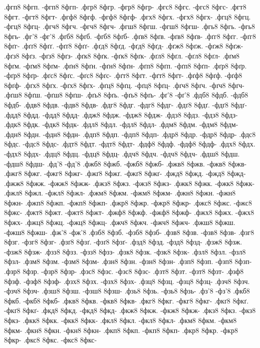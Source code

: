 {.фгп8 8фгп. -фгп8 8фгп-
.фгр8 8фгр. -фгр8 8фгр-
.фгс8 8фгс. -фгс8 8фгс-
.фгт8 8фгт. -фгт8 8фгт-
.фгф8 8фгф. -фгф8 8фгф-
.фгх8 8фгх. -фгх8 8фгх-
.фгц8 8фгц. -фгц8 8фгц-
.фгч8 8фгч. -фгч8 8фгч-
.фгш8 8фгш. -фгш8 8фгш-
.фгь8 8фгь. -фгь8 8фгь-
.фг'8 -фг'8
.фґб8 8фґб. -фґб8 8фґб-
.фґв8 8фґв. -фґв8 8фґв-
.фґг8 8фґг. -фґг8 8фґг-
.фґґ8 8фґґ. -фґґ8 8фґґ-
.фґд8 8фґд. -фґд8 8фґд-
.фґж8 8фґж. -фґж8 8фґж-
.фґз8 8фґз. -фґз8 8фґз-
.фґк8 8фґк. -фґк8 8фґк-
.фґл8 8фґл. -фґл8 8фґл-
.фґм8 8фґм. -фґм8 8фґм-
.фґн8 8фґн. -фґн8 8фґн-
.фґп8 8фґп. -фґп8 8фґп-
.фґр8 8фґр. -фґр8 8фґр-
.фґс8 8фґс. -фґс8 8фґс-
.фґт8 8фґт. -фґт8 8фґт-
.фґф8 8фґф. -фґф8 8фґф-
.фґх8 8фґх. -фґх8 8фґх-
.фґц8 8фґц. -фґц8 8фґц-
.фґч8 8фґч. -фґч8 8фґч-
.фґш8 8фґш. -фґш8 8фґш-
.фґь8 8фґь. -фґь8 8фґь-
.фґ'8 -фґ'8
.фдб8 8фдб. -фдб8 8фдб-
.фдв8 8фдв. -фдв8 8фдв-
.фдг8 8фдг. -фдг8 8фдг-
.фдґ8 8фдґ. -фдґ8 8фдґ-
.фдд8 8фдд. -фдд8 8фдд-
.фдж8 8фдж. -фдж8 8фдж-
.фдз8 8фдз. -фдз8 8фдз-
.фдк8 8фдк. -фдк8 8фдк-
.фдл8 8фдл. -фдл8 8фдл-
.фдм8 8фдм. -фдм8 8фдм-
.фдн8 8фдн. -фдн8 8фдн-
.фдп8 8фдп. -фдп8 8фдп-
.фдр8 8фдр. -фдр8 8фдр-
.фдс8 8фдс. -фдс8 8фдс-
.фдт8 8фдт. -фдт8 8фдт-
.фдф8 8фдф. -фдф8 8фдф-
.фдх8 8фдх. -фдх8 8фдх-
.фдц8 8фдц. -фдц8 8фдц-
.фдч8 8фдч. -фдч8 8фдч-
.фдш8 8фдш. -фдш8 8фдш-
.фд'8 -фд'8
.фжб8 8фжб. -фжб8 8фжб-
.фжв8 8фжв. -фжв8 8фжв-
.фжг8 8фжг. -фжг8 8фжг-
.фжґ8 8фжґ. -фжґ8 8фжґ-
.фжд8 8фжд. -фжд8 8фжд-
.фжж8 8фжж. -фжж8 8фжж-
.фжз8 8фжз. -фжз8 8фжз-
.фжк8 8фжк. -фжк8 8фжк-
.фжл8 8фжл. -фжл8 8фжл-
.фжм8 8фжм. -фжм8 8фжм-
.фжн8 8фжн. -фжн8 8фжн-
.фжп8 8фжп. -фжп8 8фжп-
.фжр8 8фжр. -фжр8 8фжр-
.фжс8 8фжс. -фжс8 8фжс-
.фжт8 8фжт. -фжт8 8фжт-
.фжф8 8фжф. -фжф8 8фжф-
.фжх8 8фжх. -фжх8 8фжх-
.фжц8 8фжц. -фжц8 8фжц-
.фжч8 8фжч. -фжч8 8фжч-
.фжш8 8фжш. -фжш8 8фжш-
.фж'8 -фж'8
.фзб8 8фзб. -фзб8 8фзб-
.фзв8 8фзв. -фзв8 8фзв-
.фзг8 8фзг. -фзг8 8фзг-
.фзґ8 8фзґ. -фзґ8 8фзґ-
.фзд8 8фзд. -фзд8 8фзд-
.фзж8 8фзж. -фзж8 8фзж-
.фзз8 8фзз. -фзз8 8фзз-
.фзк8 8фзк. -фзк8 8фзк-
.фзл8 8фзл. -фзл8 8фзл-
.фзм8 8фзм. -фзм8 8фзм-
.фзн8 8фзн. -фзн8 8фзн-
.фзп8 8фзп. -фзп8 8фзп-
.фзр8 8фзр. -фзр8 8фзр-
.фзс8 8фзс. -фзс8 8фзс-
.фзт8 8фзт. -фзт8 8фзт-
.фзф8 8фзф. -фзф8 8фзф-
.фзх8 8фзх. -фзх8 8фзх-
.фзц8 8фзц. -фзц8 8фзц-
.фзч8 8фзч. -фзч8 8фзч-
.фзш8 8фзш. -фзш8 8фзш-
.фзь8 8фзь. -фзь8 8фзь-
.фз'8 -фз'8
.фкб8 8фкб. -фкб8 8фкб-
.фкв8 8фкв. -фкв8 8фкв-
.фкг8 8фкг. -фкг8 8фкг-
.фкґ8 8фкґ. -фкґ8 8фкґ-
.фкд8 8фкд. -фкд8 8фкд-
.фкж8 8фкж. -фкж8 8фкж-
.фкз8 8фкз. -фкз8 8фкз-
.фкк8 8фкк. -фкк8 8фкк-
.фкл8 8фкл. -фкл8 8фкл-
.фкм8 8фкм. -фкм8 8фкм-
.фкн8 8фкн. -фкн8 8фкн-
.фкп8 8фкп. -фкп8 8фкп-
.фкр8 8фкр. -фкр8 8фкр-
.фкс8 8фкс. -фкс8 8фкс-
}
